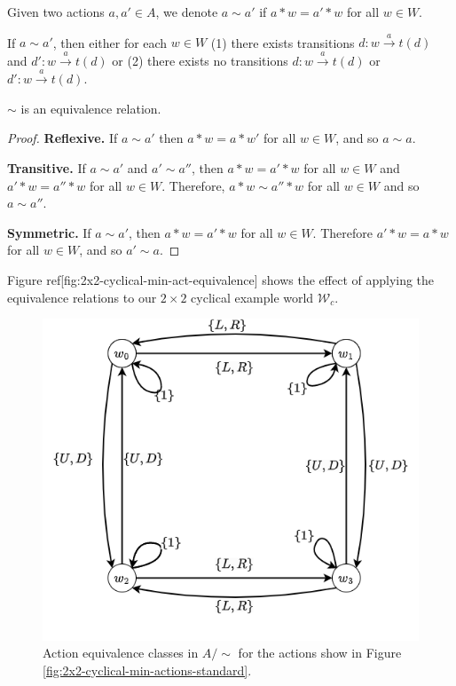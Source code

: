\begin{definition}
    Given two actions $a, a' \in A$, we denote $a \sim a'$ if $a * w = a' * w$ for all $w \in W$.
\end{definition}

\begin{remark}
    If $a \sim a'$, then either for each $w \in W$ (1) there exists transitions $d: w \xrightarrow{a} t(d)$ and $d': w \xrightarrow{a} t(d)$ or (2) there exists no transitions $d: w \xrightarrow{a} t(d)$ or $d': w \xrightarrow{a} t(d)$.
\end{remark}

\begin{proposition}
    $\sim$ is an equivalence relation.
\end{proposition}
\begin{proof}
    \textbf{Reflexive.}
    If $a \sim a'$ then $a * w = a * w'$ for all $w \in W$, and so $a \sim a$.

    \textbf{Transitive.}
    If $a \sim a'$ and $a' \sim a''$, then $a * w = a' * w$ for all $w \in W$ and $a' * w = a'' * w$ for all $w \in W$.
    Therefore, $a * w \sim a'' * w$ for all $w \in W$ and so $a \sim a''$.

    \textbf{Symmetric.}
    If $a \sim a'$, then $a * w = a' * w$ for all $w \in W$.
    Therefore $a' * w = a * w$ for all $w \in W$, and so $a' \sim a$.
\end{proof}

Figure ref[fig:2x2-cyclical-min-act-equivalence] shows the effect of applying the equivalence relations to our $2 \times 2$ cyclical example world $\mathscr{W}_{c}$.

\begin{figure}
    \centering
    \includegraphics[width=0.5\linewidth]{2MathematicalFramework/ReproducingSBDR/Images/2x2-cyclical-min-actions-equivalence.png}
    \caption{Action equivalence classes in $A/\sim$ for the actions show in Figure \ref{fig:2x2-cyclical-min-actions-standard}.}
    \label{fig:2x2-cyclical-min-act-equivalence}
\end{figure}

